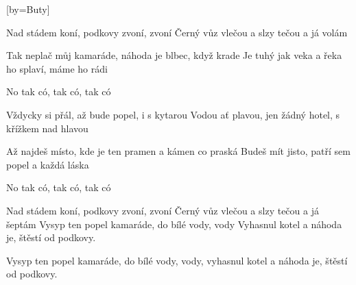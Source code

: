 [by={Buty}]

\beginverse{}
Nad stádem koní, podkovy zvoní, zvoní
Černý vůz vlečou a slzy tečou a já volám
\endverse{}

\beginverse{}
\chordsoff{}
Tak neplač můj kamaráde, náhoda je blbec, když krade
Je tuhý jak veka a řeka ho splaví, máme ho rádi
\chordson{}
\endverse{}

\beginchorus{}
No tak có, tak có, tak có
\endchorus{}

\beginverse{}
\chordsoff{}
Vždycky si přál, až bude popel, i s kytarou
Vodou ať plavou, jen žádný hotel, s křížkem nad hlavou
\chordson{}
\endverse{}

\beginverse{}
\chordsoff{}
Až najdeš místo, kde je ten pramen a kámen co praská
Budeš mít jisto, patří sem popel a každá láska
\chordson{}
\endverse{}

\repeatingchorus{}
\beginchorus{}
\chordsoff{}
No tak có, tak có, tak có
\chordson{}
\endchorus{}

\beginverse{}
\chordsoff{}
Nad stádem koní, podkovy zvoní, zvoní
Černý vůz vlečou a slzy tečou a já šeptám
Vysyp ten popel kamaráde, do bílé vody, vody 
Vyhasnul kotel a náhoda je, štěstí od podkovy.
\chordson{}
\endverse{}

\beginverse{}
\chordsoff{}
\lrep{} Vysyp ten popel kamaráde, do bílé vody, vody,
vyhasnul kotel a náhoda je, štěstí od podkovy. \rrep{}
\chordson{}
\endverse{}

\endsong{}
